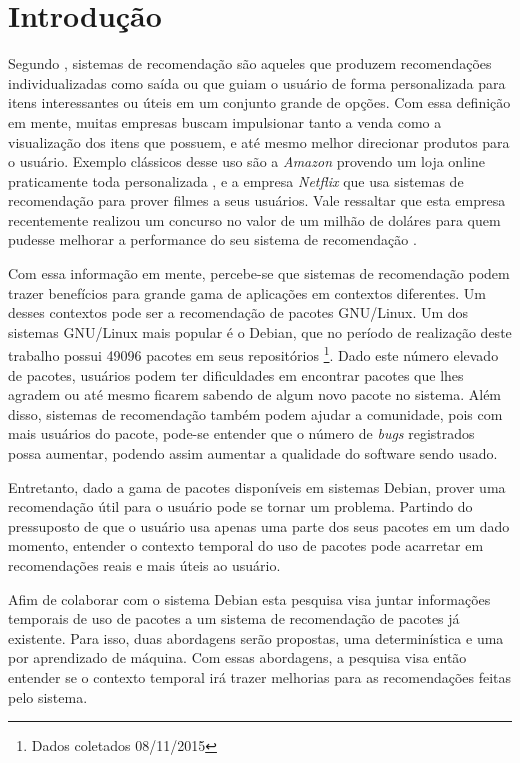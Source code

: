 \chapter*[Introdução]{Introdução}

Segundo , sistemas de recomendação são aqueles que
produzem recomendações individualizadas como saída ou que guiam o usuário
de forma personalizada para itens interessantes ou úteis em um conjunto
grande de opções. Com essa definição em mente, muitas empresas buscam
impulsionar tanto a venda como a visualização dos itens que possuem, e até mesmo
melhor direcionar produtos para o usuário. Exemplo clássicos desse uso são a
\textit{Amazon} provendo um loja online praticamente toda personalizada
\cite{jannach2008finding}, e a empresa \textit{Netflix} que usa sistemas de recomendação
para prover filmes a seus usuários. Vale ressaltar que esta empresa recentemente
realizou um concurso no valor de um milhão de doláres para quem pudesse melhorar
a performance do seu sistema de recomendação \cite{koren2009matrix}.

Com essa informação em mente, percebe-se que sistemas de recomendação podem
trazer benefícios para grande gama de aplicações em contextos diferentes. Um
desses contextos pode ser a recomendação de pacotes GNU/Linux. Um dos sistemas
GNU/Linux mais popular é o Debian, que no período de realização deste trabalho
possui 49096 pacotes em seus repositórios \footnote{Dados coletados
08/11/2015}. Dado este número elevado de pacotes, usuários podem ter
dificuldades em encontrar pacotes que lhes agradem ou até mesmo ficarem sabendo
de algum novo pacote no sistema. Além disso, sistemas de recomendação também
podem ajudar a comunidade, pois com mais usuários do pacote, pode-se entender que
o número de \textit{bugs} registrados possa aumentar, podendo assim aumentar a qualidade
do software sendo usado.

Entretanto, dado a gama de pacotes disponíveis em sistemas Debian, prover uma
recomendação útil para o usuário pode se tornar um problema. Partindo do
pressuposto de que o usuário usa apenas uma parte dos seus pacotes em um dado
momento, entender o contexto temporal  do uso de pacotes pode acarretar em recomendações reais e
mais úteis ao usuário.

Afim de colaborar com o sistema Debian esta pesquisa visa juntar informações
temporais de uso de pacotes a um sistema de recomendação de pacotes já existente.
Para isso, duas abordagens serão propostas, uma determinística e uma por aprendizado
de máquina. Com essas abordagens, a pesquisa visa então entender se o contexto temporal
irá trazer melhorias para as recomendações feitas pelo sistema.


